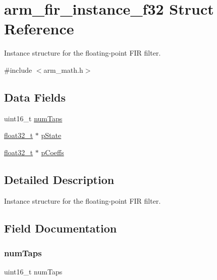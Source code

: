 \hypertarget{structarm__fir__instance__f32}{}\section{arm\+\_\+fir\+\_\+instance\+\_\+f32 Struct Reference}
\label{structarm__fir__instance__f32}


Instance structure for the floating-\/point F\+IR filter.  




{\ttfamily \#include $<$arm\+\_\+math.\+h$>$}

\subsection*{Data Fields}
\begin{DoxyCompactItemize}
\item 
uint16\+\_\+t \mbox{\hyperlink{structarm__fir__instance__f32_a751941891e47f522a7f5375fe8990aac}{num\+Taps}}
\item 
\mbox{\hyperlink{arm__math_8h_a4611b605e45ab401f02cab15c5e38715}{float32\+\_\+t}} $\ast$ \mbox{\hyperlink{structarm__fir__instance__f32_a335c87e6fdc4b96601d95a5de8b9c463}{p\+State}}
\item 
\mbox{\hyperlink{arm__math_8h_a4611b605e45ab401f02cab15c5e38715}{float32\+\_\+t}} $\ast$ \mbox{\hyperlink{structarm__fir__instance__f32_aacbb8dd8eeba4b21fc2bb40076405ee3}{p\+Coeffs}}
\end{DoxyCompactItemize}


\subsection{Detailed Description}
Instance structure for the floating-\/point F\+IR filter. 

\subsection{Field Documentation}
\mbox{\label{structarm__fir__instance__f32_a751941891e47f522a7f5375fe8990aac}} 
\subsubsection{\texorpdfstring{numTaps}{numTaps}}
{\footnotesize\ttfamily uint16\+\_\+t num\+Taps}

